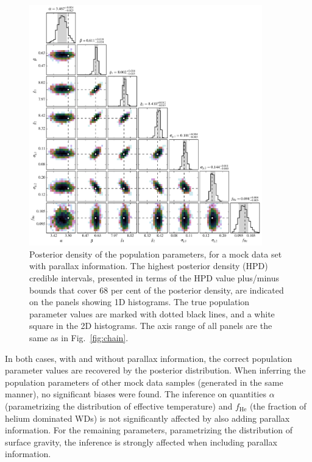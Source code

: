 \documentclass[fleqn,usenatbib]{mnras}
\begin{document}
\begin{figure}
	\includegraphics[width=0.9\textwidth]{toy_chain_include-parallax.pdf}
    \caption{ Posterior density of the population parameters, for a mock data set with parallax information. The highest posterior density (HPD) credible intervals, presented in terms of the HPD value plus/minus bounds that cover 68 per cent of the posterior density, are indicated on the panels showing 1D histograms. The true population parameter values are marked with dotted black lines, and a white square in the 2D histograms. The axis range of all panels are the same as in Fig.~\ref{fig:chain}.}
    \label{fig:chain_parallax}
\end{figure}

In both cases, with and without parallax information, the correct population parameter values are recovered by the posterior distribution. When inferring the population parameters of other mock data samples (generated in the same manner), no significant biases were found. The inference on quantities $\alpha$ (parametrizing the distribution of effective temperature) and $f_\text{He}$ (the fraction of helium dominated WDs) is not significantly affected by also adding parallax information. For the remaining parameters, parametrizing the distribution of surface gravity, the inference is strongly affected when including parallax information.
\end{document}
